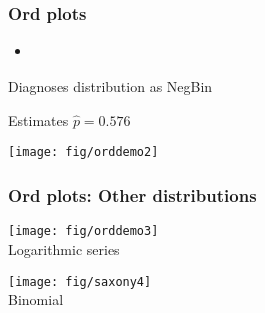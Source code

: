 \begin{frame}[fragile]
\frametitle{Ord plots}
\begin{itemize}
\item {}
\begin{Code}
\end{Code}
\end{itemize}

 \begin{minipage}[c]{.4\dispwidth}
	\begin{itemize*}
	\item Diagnoses distribution as NegBin
	\item Estimates $\hat{p} = 0.576$
	\end{itemize*}
 \end{minipage}
 \hfill
 \begin{minipage}[c]{.59\dispwidth}
  \begin{center}
  \texttt{[image: fig/orddemo2]}
  \end{center}
 \end{minipage}
\end{frame}
	

\begin{frame}
\frametitle{Ord plots: Other distributions}

 \begin{minipage}[c]{.49\dispwidth}
  \texttt{[image: fig/orddemo3]}
  \\ \centering Logarithmic series
 \end{minipage}%
 \hfill
 \begin{minipage}[c]{.49\dispwidth}
  \texttt{[image: fig/saxony4]}
  \\ \centering Binomial
 \end{minipage}
\end{frame}

